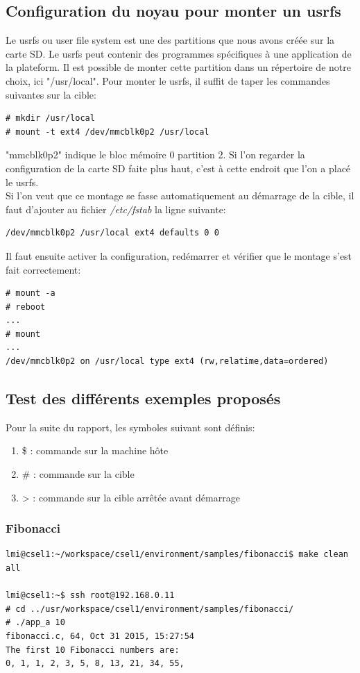 \subsection{Configuration du noyau pour monter un usrfs}
Le usrfs ou user file system est une des partitions que nous avons créée sur la carte SD. Le usrfs peut contenir des programmes spécifiques à une application de la plateform. Il est possible de monter cette partition dans un répertoire de notre choix, ici "/usr/local". Pour monter le usrfs, il suffit de taper les commandes suivantes sur la cible:
\begin{lstlisting}
# mkdir /usr/local
# mount -t ext4 /dev/mmcblk0p2 /usr/local
\end{lstlisting}
"mmcblk0p2" indique le bloc mémoire 0 partition 2. Si l'on regarder la configuration de la carte SD faite plus haut, c'est à cette endroit que l'on a placé le usrfs.\\
Si l'on veut que ce montage se fasse automatiquement au démarrage de la cible, il faut d'ajouter au fichier \textit{/etc/fstab} la ligne suivante:
\begin{lstlisting}
/dev/mmcblk0p2 /usr/local ext4 defaults 0 0
\end{lstlisting}
Il faut ensuite activer la configuration, redémarrer et vérifier que le montage s'est fait correctement:
\begin{lstlisting}
# mount -a
# reboot
...
# mount                                                                         
...
/dev/mmcblk0p2 on /usr/local type ext4 (rw,relatime,data=ordered)      
\end{lstlisting}

\subsection{Test des différents exemples proposés}
Pour la suite du rapport, les symboles suivant sont définis:
\begin{enumerate}
	\item \$ : commande sur la machine hôte
	\item \# : commande sur la cible
	\item > : commande sur la cible arrêtée avant démarrage
\end{enumerate}

\subsubsection{Fibonacci}
\begin{lstlisting}
lmi@csel1:~/workspace/csel1/environment/samples/fibonacci$ make clean all

lmi@csel1:~$ ssh root@192.168.0.11
# cd ../usr/workspace/csel1/environment/samples/fibonacci/
# ./app_a 10
fibonacci.c, 64, Oct 31 2015, 15:27:54
The first 10 Fibonacci numbers are:
0, 1, 1, 2, 3, 5, 8, 13, 21, 34, 55,
\end{lstlisting}

